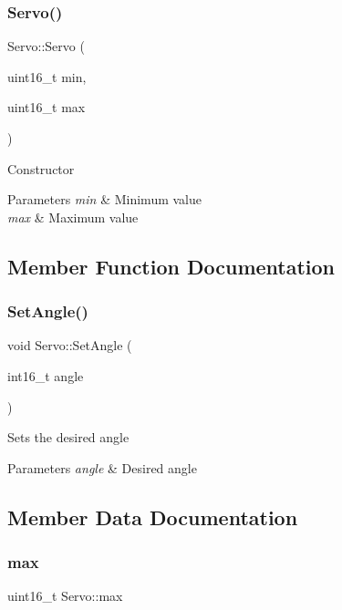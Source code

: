 \subsubsection{\texorpdfstring{Servo()}{Servo()}}
{\footnotesize\ttfamily Servo\+::\+Servo (\begin{DoxyParamCaption}\item[{uint16\+\_\+t}]{min,  }\item[{uint16\+\_\+t}]{max }\end{DoxyParamCaption})}

Constructor 
\begin{DoxyParams}{Parameters}
{\em min} & Minimum value \\
\hline
{\em max} & Maximum value \\
\hline
\end{DoxyParams}


\subsection{Member Function Documentation}
\hypertarget{class_servo_ae5ebb4d5baa92a4427e51d7667b41fbf}{}\label{class_servo_ae5ebb4d5baa92a4427e51d7667b41fbf} 
\subsubsection{\texorpdfstring{Set\+Angle()}{SetAngle()}}
{\footnotesize\ttfamily void Servo\+::\+Set\+Angle (\begin{DoxyParamCaption}\item[{int16\+\_\+t}]{angle }\end{DoxyParamCaption})}

Sets the desired angle 
\begin{DoxyParams}{Parameters}
{\em angle} & Desired angle \\
\hline
\end{DoxyParams}


\subsection{Member Data Documentation}
\hypertarget{class_servo_a685a44f23a5f1a58577bbf88bba3997e}{}\label{class_servo_a685a44f23a5f1a58577bbf88bba3997e} 
\subsubsection{\texorpdfstring{max}{max}}
{\footnotesize\ttfamily uint16\+\_\+t Servo\+::max\hspace{0.3cm}{\ttfamily [private]}}

